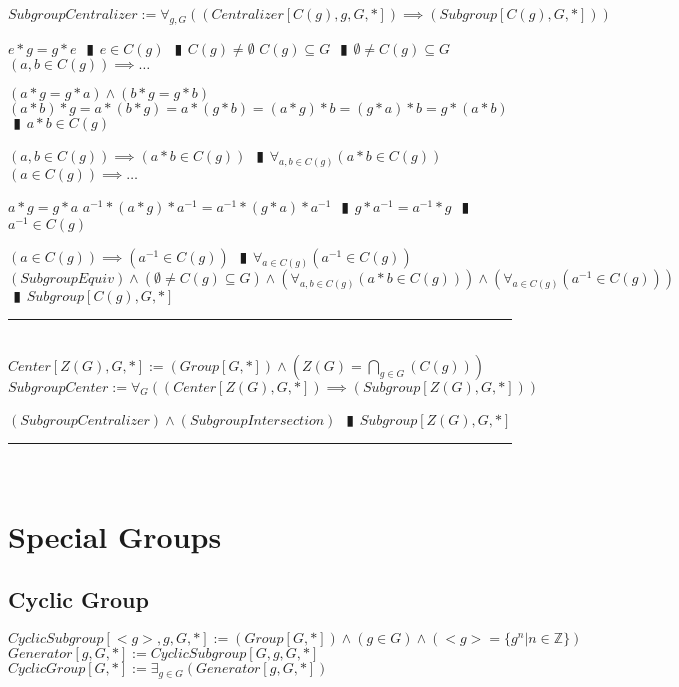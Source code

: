 \documentclass{book}
\newcommand{\abr}{:=}
\newcommand{\pipe}{$\phantom{(}\vrectangleblack\phantom{)}$}
\newcommand{\pr}[1]{\left(#1\right)}
\begin{document}
$SubgroupCentralizer \abr \forall_{g, G}\pr{\pr{Centralizer[C(g), g, G, *]} \implies \pr{Subgroup[C(g), G, *]}}$
\begin{enumerate}
  \lit $e * g = g * e$ \pipe $e \in C(g)$ \pipe $C(g) \neq \emptyset$
  \lit $C(g) \subseteq G$ \pipe $\emptyset \neq C(g) \subseteq G$
  \lit $\pr{a, b \in C(g)} \implies \ldots$
  \begin{enumerate}
    \lit $(a * g = g * a) \land (b * g = g * b)$
    \lit $(a * b) * g = a * (b * g) = a * (g * b) = (a * g) * b = (g * a) * b = g * (a * b)$ \pipe $a * b \in C(g)$
  \end{enumerate}
  \lit $\pr{a, b \in C(g)} \implies \pr{a * b \in C(g)}$ \pipe $\forall_{a, b \in C(g)}\pr{a * b \in C(g)}$
  \lit $\pr{a \in C(g)} \implies \ldots$
  \begin{enumerate}
    \lit $a * g = g * a$
    \lit $a^{-1} * (a * g) * a^{-1} = a^{-1} * (g * a) * a^{-1}$ \pipe $g * a^{-1} = a^{-1} * g$ \pipe $a^{-1} \in C(g)$
  \end{enumerate}
  \lit $\pr{a \in C(g)} \implies \pr{a^{-1} \in C(g)}$ \pipe $\forall_{a \in C(g)}\pr{a^{-1} \in C(g)}$
  \lit $(SubgroupEquiv) \land \pr{\emptyset \neq C(g) \subseteq G} \land \pr{\forall_{a, b \in C(g)}\pr{a * b \in C(g)}} \land \pr{\forall_{a \in C(g)}\pr{a^{-1} \in C(g)}}$ \pipe $Subgroup[C(g), G, *]$
\end{enumerate} \vspace{.75mm} \hrule \vspace{.75mm} \ \\ 

$Center[Z(G), G, *] \abr (Group[G, *]) \land \pr{Z(G) = \bigcap\limits_{g \in G}\pr{C(g)}}$ \\

$SubgroupCenter \abr \forall_{G}\pr{\pr{Center[Z(G), G, *]} \implies \pr{Subgroup[Z(G), G, *]}}$
\begin{enumerate}
  \lit $(SubgroupCentralizer) \land (SubgroupIntersection)$ \pipe $Subgroup[Z(G), G, *]$
\end{enumerate} \vspace{.75mm} \hrule \vspace{.75mm} \ \\ 


\section{Special Groups}
\subsection{Cyclic Group}
$CyclicSubgroup[<g>, g, G, *] \abr (Group[G, *]) \land (g \in G) \land (<g> = \{g^n | n \in \mathbb{Z}\})$ \\
$Generator[g, G, *] \abr CyclicSubgroup[G, g, G, *]$ \\
$CyclicGroup[G, *] \abr \exists_{g \in G}(Generator[g, G, *])$ \\
\end{document}
